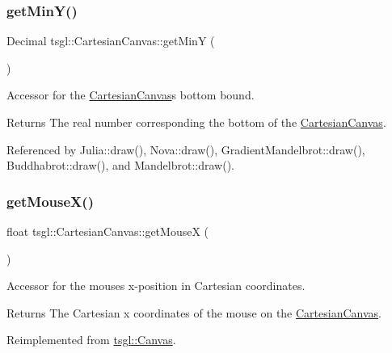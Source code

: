 \subsubsection{\texorpdfstring{get\+Min\+Y()}{getMinY()}}
{\footnotesize\ttfamily Decimal tsgl\+::\+Cartesian\+Canvas\+::get\+MinY (\begin{DoxyParamCaption}{ }\end{DoxyParamCaption})\hspace{0.3cm}{\ttfamily [inline]}}



Accessor for the \hyperlink{classtsgl_1_1_cartesian_canvas}{Cartesian\+Canvas}\textquotesingle{}s bottom bound. 

\begin{DoxyReturn}{Returns}
The real number corresponding the bottom of the \hyperlink{classtsgl_1_1_cartesian_canvas}{Cartesian\+Canvas}. 
\end{DoxyReturn}


Referenced by Julia\+::draw(), Nova\+::draw(), Gradient\+Mandelbrot\+::draw(), Buddhabrot\+::draw(), and Mandelbrot\+::draw().

\mbox{\label{classtsgl_1_1_cartesian_canvas_afd62dffbd1343ddecdd734a6954f6f87}} 
\subsubsection{\texorpdfstring{get\+Mouse\+X()}{getMouseX()}}
{\footnotesize\ttfamily float tsgl\+::\+Cartesian\+Canvas\+::get\+MouseX (\begin{DoxyParamCaption}{ }\end{DoxyParamCaption})\hspace{0.3cm}{\ttfamily [virtual]}}



Accessor for the mouse\textquotesingle{}s x-\/position in Cartesian coordinates. 

\begin{DoxyReturn}{Returns}
The Cartesian x coordinates of the mouse on the \hyperlink{classtsgl_1_1_cartesian_canvas}{Cartesian\+Canvas}. 
\end{DoxyReturn}


Reimplemented from \hyperlink{classtsgl_1_1_canvas_aae30eddfb15b6a549dc162e4a11a149d}{tsgl\+::\+Canvas}.



